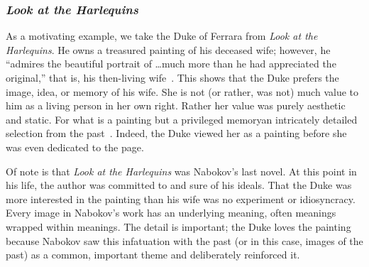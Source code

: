 \subsubsection{\emph{Look at the Harlequins}}
As a motivating example, we take the Duke of Ferrara from \emph{Look at the Harlequins}.
He owns a treasured painting of his deceased wife; however, he ``admires the beautiful portrait of \ldots much more than he had appreciated the original,'' that is, his then-living wife~\cite[3]{toker}.
This shows that the Duke prefers the image, idea, or memory of his wife.
She is not (or rather, was not) much value to him as a living person in her own right. 
Rather her value was purely aesthetic and static. 
For what is a painting but a privileged memory\textemdash an intricately detailed selection from the past~\cite{sartre1964nausea}. 
Indeed, the Duke viewed her as a painting before she was even dedicated to the page. 

Of note is that \emph{Look at the Harlequins} was Nabokov's last novel. 
At this point in his life, the author was committed to and sure of his ideals. 
That the Duke was more interested in the painting than his wife was no experiment or idiosyncracy.
Every image in Nabokov's work has an underlying meaning, often meanings wrapped within meanings.
The detail is important; the Duke loves the painting because Nabokov saw this infatuation with the past (or in this case, images of the past) as a common, important theme and deliberately reinforced it.

